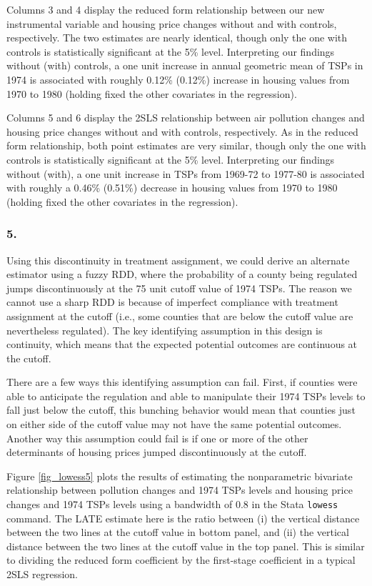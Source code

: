 \documentclass[12pt]{article}
\begin{document}
Columns 3 and 4 display the reduced form relationship between our new instrumental variable and housing price changes without and with controls, respectively. The two estimates are nearly identical, though only the one with controls is statistically significant at the 5\% level. Interpreting our findings without (with) controls, a one unit increase in annual geometric mean of TSPs in 1974 is associated with roughly 0.12\% (0.12\%) increase in housing values from 1970 to 1980 (holding fixed the other covariates in the regression).

Columns 5 and 6 display the 2SLS relationship between air pollution changes and housing price changes without and with controls, respectively. As in the reduced form relationship, both point estimates are very similar, though only the one with controls is statistically significant at the 5\% level. Interpreting our findings without (with), a one unit increase in TSPs from 1969-72 to 1977-80 is associated with roughly a 0.46\% (0.51\%) decrease in housing values from 1970 to 1980 (holding fixed the other covariates in the regression).

\subsubsection*{5.}
Using this discontinuity in treatment assignment, we could derive an alternate estimator using a fuzzy RDD, where the probability of a county being regulated jumps discontinuously at the 75 unit cutoff value of 1974 TSPs. The reason we cannot use a sharp RDD is because of imperfect compliance with treatment assignment at the cutoff (i.e., some counties that are below the cutoff value are nevertheless regulated). The key identifying assumption in this design is continuity, which means that the expected potential outcomes are continuous at the cutoff. 

There are a few ways this identifying assumption can fail. First, if counties were able to anticipate the regulation and able to manipulate their 1974 TSPs levels to fall just below the cutoff, this bunching behavior would mean that counties just on either side of the cutoff value may not have the same potential outcomes. Another way this assumption could fail is if one or more of the other determinants of housing prices jumped discontinuously at the cutoff.

Figure \ref{fig_lowess5} plots the results of estimating the nonparametric bivariate relationship between pollution changes and 1974 TSPs levels and housing price changes and 1974 TSPs levels using a bandwidth of 0.8 in the Stata \texttt{lowess} command. The LATE estimate here is the ratio between (i) the vertical distance between the two lines at the cutoff value in bottom panel, and (ii) the vertical distance between the two lines at the cutoff value in the top panel. This is similar to dividing the reduced form coefficient by the first-stage coefficient in a typical 2SLS regression.
\end{document}
